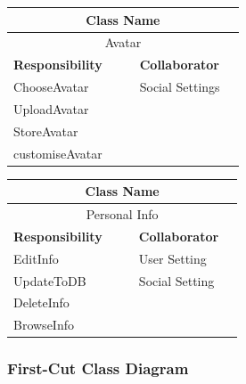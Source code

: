 \documentclass[a4paper]{article}
\begin{document}
	\noindent\begin{minipage}{\textwidth}
		\begin{minipage}[t]{0.48\textwidth}
	 	\centering
		\makeatletter{}\makeatother\caption*{}
		  	\begin{tabular}{|p{0.48\linewidth}|p{0.40\linewidth}|} 
	   			\hline
				\multicolumn{2}{|c|}{\textbf{Class Name}} \\
				\hline
				\multicolumn{2}{|c|}{Avatar} \\
				\hline
				\textbf{Responsibility} & \textbf{Collaborator} \\
				\hline
				ChooseAvatar& Social Settings\\
				UploadAvatar& \\
				StoreAvatar& \\
				customiseAvatar& \\
				\hline
	   		\end{tabular}
	 	\end{minipage}
	 	\begin{minipage}[t]{0.48\textwidth}
		\centering
		\makeatletter{}\makeatother\caption*{}
			\begin{tabular}{|p{0.48\linewidth}|p{0.40\linewidth}|} 
				\hline
				\multicolumn{2}{|c|}{\textbf{Class Name}} \\
				\hline
				\multicolumn{2}{|c|}{Personal Info} \\
				\hline
				\textbf{Responsibility} & \textbf{Collaborator} \\
				\hline
				EditInfo& User Setting\\
				UpdateToDB& Social Setting\\
				DeleteInfo&\\
				BrowseInfo&\\
				\hline
			\end{tabular}
		\end{minipage}
   	\end{minipage}

	\newpage

	\subsubsection{First-Cut Class Diagram}
\end{document}
